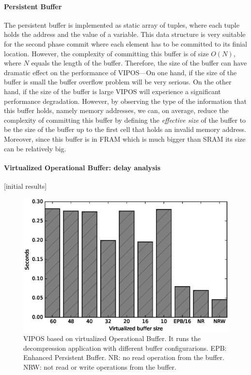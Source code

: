 \documentclass[sigconf,anonymous,review]{acmart}
\begin{document}
		\paragraph{Persistent Buffer}
			The persistent buffer is implemented as static array of tuples, where each tuple holds  the address and the value of a variable. This data structure is very suitable for the second phase commit where each element has to be committed to its finial location. However, the complexity of committing this buffer is of size $O(N)$, where $N$ equals the length of the buffer. Therefore, the size of the buffer can have dramatic effect on the performance of VIPOS---On one hand, if the size of the buffer is small the buffer overflow problem will be very serious. On the other hand, if the size of the buffer is large VIPOS will experience a significant performance degradation. However, by observing the type of the information that this buffer holds, namely memory addresses, we can, on average, reduce the complexity of committing this buffer by defining the \emph{effective size} of the buffer to be the size of the buffer up to the first cell that holds an invalid memory address. Moreover, since this buffer is in FRAM which is much bigger than SRAM its size can be relatively big. 

		\paragraph{Virtualized Operational Buffer: delay analysis}[initial results]

		\begin{figure}[t]
			\centering
			\includegraphics[width=\columnwidth]{figures/virtual_buffer_size.eps}
			\caption{VIPOS based on virtualized Operational Buffer. It runs the decompression application with different buffer configurarions. EPB: Enhanced Persistent Buffer. NR: no read operation from the buffer. NRW: not read or write operations from the buffer.}
			\label{fig:virtOperationalBuf}
		\end{figure}
\end{document}
